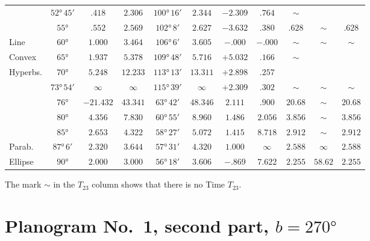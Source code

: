 \documentclass[11pt,a4paper]{article}
\theoremstyle{definition}
\begin{document}
\begin{center}
\begin{tabular}{|l|c|c|c|c|c|c|c|c|c|c|}
 & $52°\,45'$ & $.418$ & $2.306$ & $100°\,16'$ & $2.344$ & $-2.309$ & $.764$ & $\sim$ & & \\
 & $55°$ & $.552$ & $2.569$ & $102°\,8'$ & $2.627$ & $-3.632$ & $.380$ & $.628$ & $\sim$ & $.628$ \\
\hline
Line & $60°$ & $1.000$ & $3.464$ & $106°\,6'$ & $3.605$ & $-.000$ & $-.000$ & $\sim$ & $\sim$ & $\sim$ \\
\hline
Convex & $65°$ & $1.937$ & $5.378$ & $109°\,48'$ & $5.716$ & $+5.032$ & $.166$ & $\sim$ & & \\
Hyperbs. & $70°$ & $5.248$ & $12.233$ & $113°\,13'$ & $13.311$ & $+2.898$ & $.257$ & & & \\
 & $73°\,54'$ & $\infty$ & $\infty$ & $115°\,39'$ & $\infty$ & $+2.309$ & $.302$ & $\sim$ & $\sim$ & $\sim$ \\
 & $76°$ & $-21.432$ & $43.341$ & $63°\,42'$ & $48.346$ & $2.111$ & $.900$ & $20.68$ & $\sim$ & $20.68$ \\
 & $80°$ & $4.356$ & $7.830$ & $60°\,55'$ & $8.960$ & $1.486$ & $2.056$ & $3.856$ & $\sim$ & $3.856$ \\
 & $85°$ & $2.653$ & $4.322$ & $58°\,27'$ & $5.072$ & $1.415$ & $8.718$ & $2.912$ & $\sim$ & $2.912$ \\
\hline
Parab. & $87°\,6'$ & $2.320$ & $3.644$ & $57°\,31'$ & $4.320$ & $1.000$ & $\infty$ & $2.588$ & $\infty$ & $2.588$ \\
\hline
Ellipse & $90°$ & $2.000$ & $3.000$ & $56°\,18'$ & $3.606$ & $-.869$ & $7.622$ & $2.255$ & $58.62$ & $2.255$ \\
\hline
\end{tabular}
\end{center}

The mark $\sim$ in the $T_{23}$ column shows that there is no Time $T_{23}$.

\newpage
\section*{Planogram No.~1, second part, $b = 270°$}
\end{document}
